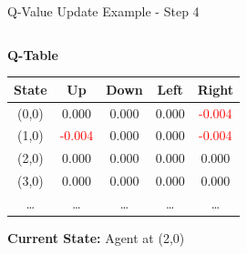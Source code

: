 \documentclass[aspectratio=169]{beamer}
\begin{document}
\begin{frame}{Q-Value Update Example - Step 4}
    
    \begin{columns}
        \begin{column}{0.45\textwidth}
            \textbf{Q-Table}
            \small
            \begin{table}[h]
                \centering
                \begin{tabular}{|c|c|c|c|c|}
                    \hline
                    \textbf{State} & \textbf{Up} & \textbf{Down} & \textbf{Left} & \textbf{Right} \\
                    \hline
                    (0,0) & 0.000 & 0.000 & 0.000 & \textcolor{red}{-0.004} \\
                    (1,0) & \textcolor{red}{-0.004} & 0.000 & 0.000 & \textcolor{red}{-0.004} \\
                    (2,0) & 0.000 & 0.000 & 0.000 & 0.000 \\
                    (3,0) & 0.000 & 0.000 & 0.000 & 0.000 \\
                    \dots & \dots & \dots & \dots & \dots \\
                    \hline
                \end{tabular}
            \end{table}
            
            \textbf{Current State:} Agent at (2,0)


        \end{column}
        

\end{columns}
\end{frame}
\end{document}
